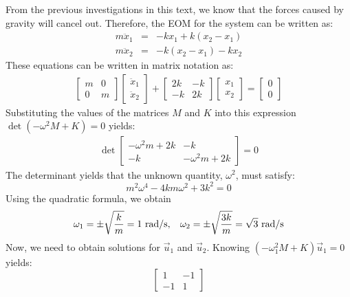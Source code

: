 \documentclass[12pt,letter]{article}
\begin{document}
\begin{example}
\noindent  From the previous investigations in this text, we know that the forces caused by gravity will cancel out. Therefore, the EOM for the system can be written as:
\begin{eqnarray}
m\ddot{x}_1 &= & -kx_1 + k(x_2-x_1) \\
m\ddot{x}_2&= & -k(x_2-x_1) -kx_2 \nonumber
\end{eqnarray}
These equations can be written in matrix notation as:
\begin{eqnarray}
 \begin{bmatrix} m & 0  \\  0 & m \end{bmatrix}\begin{bmatrix} \ddot{x}_1 \\  \ddot{x}_2 \end{bmatrix} + \begin{bmatrix} 2k & -k  \\  -k & 2k \end{bmatrix}\begin{bmatrix} x_1 \\  x_2 \end{bmatrix} = \begin{bmatrix} 0 \\  0 \end{bmatrix}
\end{eqnarray}
\pagebreak
Substituting the values of the matrices $M$ and $K$ into this expression $\det(-\omega^2 M  + K) = 0$ yields: 
\begin{eqnarray}
\det\begin{bmatrix} -\omega^2 m + 2k & -k  \\  -k & -\omega^2 m + 2k \end{bmatrix}=0
\end{eqnarray}
The determinant yields that the unknown quantity, $\omega^2$, must satisfy:
\begin{equation}
m^2 \omega^4 - 4km\omega^2 + 3k^2 = 0
\end{equation}
Using the quadratic formula, we obtain
\begin{equation}
\omega_1 = \pm \sqrt{\frac{k}{m}}=1 \text{ rad/s}, \hspace{2ex} \omega_2 = \pm \sqrt{\frac{3k}{m}}=\sqrt{3} \text{ rad/s}
\end{equation}
Now, we need to obtain solutions for $\vec{u}_1$ and $\vec{u}_2$. Knowing $(-\omega_1^2 M  + K)\vec{u}_1 =0$ yields:
\begin{equation}
 \begin{bmatrix} 1 & -1 \\    -1  & 1 \end{bmatrix} 

\end{equation}
\end{example}
\end{document}
